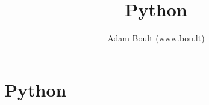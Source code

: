 \documentclass[oneside]{book}
\begin{document}
\author{Adam Boult (www.bou.lt)}
\title{Python}
\maketitle

\setcounter{tocdepth}{0}
\tableofcontents



\part{Python}






\end{document}
